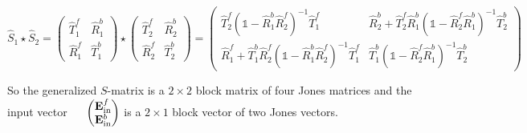 \begin{equation}\label{eq:bg:star}
    \hat S_1 \star \hat S_2 =
    \begin{pmatrix}
        \hat T^f_1 & \hat R^b_1 \\
        \hat R^f_1 & \hat T^b_1
    \end{pmatrix}
    \star
    \begin{pmatrix}
        \hat T^f_2 & \hat R^b_2 \\
        \hat R^f_2 & \hat T^b_2
    \end{pmatrix}
    =
    \begin{pmatrix}
        \hat T^f_2 (\mathds 1 - \hat R^b_1 \hat R^f_2)^{-1} \hat T^f_1 &
        \hat R^b_2 + \hat T^f_2 \hat R^b_1 (\mathds 1 - \hat R^f_2 \hat R^b_1)^{-1} \hat T^b_2\\
        \hat R^f_1 + \hat T^b_1 \hat R^f_2 (\mathds 1 - \hat R^b_1 \hat R^f_2)^{-1} \hat T^f_1 &
        \hat T^b_1 (\mathds 1 - \hat R^f_2 \hat R^b_1)^{-1} \hat T^b_2
    \end{pmatrix}
\end{equation}

So the generalized $S$-matrix is a $2 \times 2$ block matrix of four Jones matrices and the input vector $\quad $
$
\begin{pmatrix}
    \vb E^f_{\mathrm{in}} \\
    \vb E^b_{\mathrm{in}}
\end{pmatrix}
$
is a $2 \times 1$ block vector of two Jones vectors.
